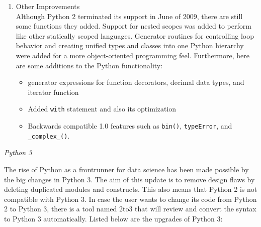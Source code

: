 \documentclass{article}
\begin{document}
\begin{enumerate}
    \item Other Improvements\\
    Although Python 2 terminated its support in June of 2009, there are still some functions they added. Support for nested scopes was added to perform like other statically scoped languages. Generator routines for controlling loop behavior and creating unified types and classes into one Python hierarchy were added for a more object-oriented programming feel. Furthermore, here are some additions to the Python functionality:
    \begin{itemize}
        \item generator expressions for function decorators, decimal data types, and iterator function
        \item Added \texttt{with} statement and also its optimization
        \item Backwards compatible 1.0 features such as \texttt{bin()}, \texttt{typeError}, and \verb|_complex_()|.
    \end{itemize}

\end{enumerate}

\par
\noindent
\textit{Python 3}

\par
The rise of Python as a frontrunner for data science has been made possible by the big changes in Python 3. The aim of this update is to remove design flaws by deleting duplicated modules and constructs. This also means that Python 2 is not compatible with Python 3. In case the user wants to change its code from Python 2 to Python 3, there is a tool named 2to3 that will review and convert the syntax to Python 3 automatically. Listed below are the upgrades of Python 3:
\end{document}
